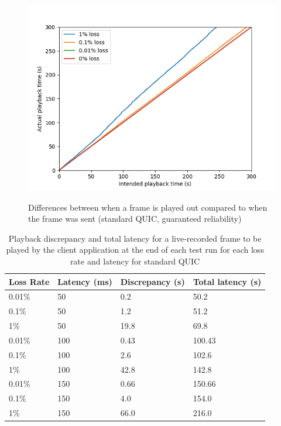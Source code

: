 \documentclass{mpaper}
\begin{document}
\begin{figure}
{   \includegraphics[scale=0.5]{images/graphics-reliable/150ms-relative-offsets-combined-reliable.png}
   \label{playback-offsets-rel-150}
 }
 \caption{Differences between when a frame is played out compared to when the frame was sent (standard QUIC, guaranteed reliability)}
 \label{playback-offsets-rel}
\end{figure}

\begin{table}[h!]
\centering
\label{stalls-data-rel}
\begin{center}
\begin{tabular}{|p{1.5cm}|p{1.5cm}|p{2cm}|p{2cm}|}
\hline
Loss Rate & Latency (ms) & Discrepancy (s) & Total latency (s)\\ \hline
0.01\%  & 50 & 0.2 & 50.2 \\ \hline
0.1\%  & 50 & 1.2 & 51.2 \\ \hline
1\%  & 50 & 19.8 & 69.8 \\ \hline
0.01\%  & 100 & 0.43 & 100.43 \\ \hline
0.1\%  & 100 & 2.6 & 102.6 \\ \hline
1\%  & 100 & 42.8 & 142.8 \\ \hline
0.01\%  & 150 & 0.66 & 150.66 \\ \hline
0.1\%  & 150 & 4.0 & 154.0 \\ \hline
1\%  & 150 & 66.0 & 216.0 \\ \hline

\end{tabular}
\caption{Playback discrepancy and total latency for a live-recorded frame to be played by the client application at the end of each test run for each loss rate and latency for standard QUIC}
\label{relative-offset-table}
\end{center}
\end{table}
\end{document}
